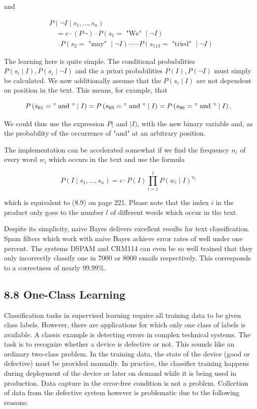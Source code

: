 \documentclass[10pt]{article}
\begin{document}
and

$$
\begin{aligned}
& P\left(\neg I \mid s_{1}, \ldots, s_{n}\right) \\
& \quad=c \cdot(P \neg) \cdot P\left(s_{1}=\text { "We" } \mid \neg I\right) \\
& \quad \cdot P\left(s_{2}=\text { "may" } \mid \neg I\right) \cdots \cdots P\left(s_{113}=\text { "tried" } \mid \neg I\right)
\end{aligned}
$$

The learning here is quite simple. The conditional probabilities $P\left(s_{i} \mid I\right), P\left(s_{i} \mid \neg I\right)$ and the a priori probabilities $P(I), P(\neg I)$ must simply be calculated. We now additionally assume that the $P\left(s_{i} \mid I\right)$ are not dependent on position in the text. This means, for example, that

$$
P\left(s_{61}=" \text { and } " \mid I\right)=P\left(s_{69}=" \text { and } " \mid I\right)=P\left(s_{86}=" \text { and } " \mid I\right) .
$$

We could thus use the expression $P($ and $\mid I)$, with the new binary variable and, as the probability of the occurrence of "and" at an arbitrary position.

The implementation can be accelerated somewhat if we find the frequency $n_{i}$ of every word $w_{i}$ which occurs in the text and use the formula


\begin{equation*}
P\left(I \mid s_{1}, \ldots, s_{n}\right)=c \cdot P(I) \prod_{i=1}^{l} P\left(w_{i} \mid I\right)^{n_{i}} \tag{8.10}
\end{equation*}


which is equivalent to (8.9) on page 221. Please note that the index $i$ in the product only goes to the number $l$ of different words which occur in the text.

Despite its simplicity, naive Bayes delivers excellent results for text classification. Spam filters which work with naive Bayes achieve error rates of well under one percent. The systems DSPAM and CRM114 can even be so well trained that they only incorrectly classify one in 7000 or 8000 emails respectively. This corresponds to a correctness of nearly $99.99 \%$.

\subsection*{8.8 One-Class Learning}
Classification tasks in supervised learning require all training data to be given class labels. However, there are applications for which only one class of labels is available. A classic example is detecting errors in complex technical systems. The task is to recognize whether a device is defective or not. This sounds like an ordinary two-class problem. In the training data, the state of the device (good or defective) must be provided manually. In practice, the classifier training happens during deployment of the device or later on demand while it is being used in production. Data capture in the error-free condition is not a problem. Collection of data from the defective system however is problematic due to the following reasons:
\end{document}
